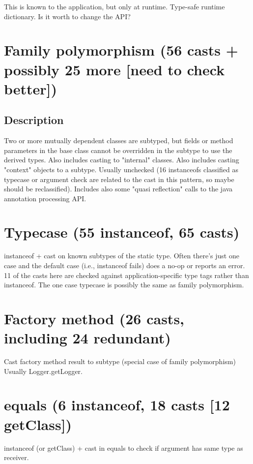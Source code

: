 \documentclass{usiinfdocprop}
\begin{document}
This is known to the application, but only at runtime.
Type-safe runtime dictionary. 
Is it worth to change the API? 

\section{Family polymorphism (56 casts + possibly 25 more [need to check better])}
\label{sec:orga7c8f3e}

\subsection{Description}
\label{sec:orgca82bb4}

Two or more mutually dependent classes are subtyped, but fields or method parameters in the base class cannot be overridden in the subtype to use the derived types. 
Also includes casting to "internal" classes. 
Also includes casting "context" objects to a subtype. 
Usually unchecked (16 instanceofs classified as typecase or argument check are related to the cast in this pattern, so maybe should be reclassified). 
Includes also some "quasi reflection" calls to the java annotation processing API. 

\section{Typecase (55 instanceof, 65 casts)}
\label{sec:org02d1e7e}

instanceof + cast on known subtypes of the static type. 
Often there's just one case and the default case (i.e., instanceof fails) does a no-op or reports an error. 
11 of the casts here are checked against application-specific type tags rather than instanceof. 
The one case typecase is possibly the same as family polymorphism. 

\section{Factory method (26 casts, including 24 redundant)}
\label{sec:org875caac}

Cast factory method result to subtype (special case of family polymorphism) 
Usually Logger.getLogger. 

\section{equals (6 instanceof, 18 casts [12 getClass])}
\label{sec:orgf000ab3}
instanceof (or getClass) + cast in equals to check if argument has same type as receiver. 
\end{document}
